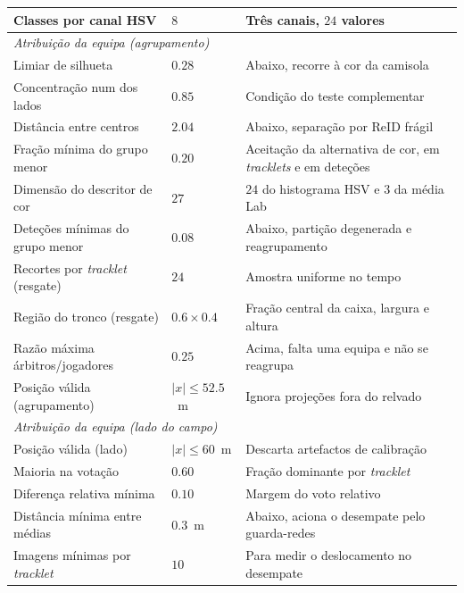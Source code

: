 \begin{table}[htbp]
\begin{tabular}{|l|l|l|}
        \hline
        Classes por canal HSV        & $8$             & Três canais, $24$ valores \\
        \hline
        \multicolumn{3}{|l|}{\emph{Atribuição da equipa (agrupamento)}} \\
        \hline
        Limiar de silhueta           & $0.28$          & Abaixo, recorre à cor da camisola \\
        \hline
        Concentração num dos lados   & $0.85$          & Condição do teste complementar \\
        \hline
        Distância entre centros      & $2.04$          & Abaixo, separação por ReID frágil \\
        \hline
        Fração mínima do grupo menor & $0.20$          & Aceitação da alternativa de cor, em \emph{tracklets} e em deteções \\
        \hline
        Dimensão do descritor de cor & $27$            & $24$ do histograma HSV e $3$ da média Lab \\
        \hline
        Deteções mínimas do grupo menor & $0.08$       & Abaixo, partição degenerada e reagrupamento \\
        \hline
        Recortes por \emph{tracklet} (resgate) & $24$  & Amostra uniforme no tempo \\
        \hline
        Região do tronco (resgate)   & $0.6 \times 0.4$ & Fração central da caixa, largura e altura \\
        \hline
        Razão máxima árbitros/jogadores & $0.25$       & Acima, falta uma equipa e não se reagrupa \\
        \hline
        Posição válida (agrupamento) & $|x| \le 52.5$~m & Ignora projeções fora do relvado \\
        \hline
        \multicolumn{3}{|l|}{\emph{Atribuição da equipa (lado do campo)}} \\
        \hline
        Posição válida (lado)        & $|x| \le 60$~m   & Descarta artefactos de calibração \\
        \hline
        Maioria na votação           & $0.60$          & Fração dominante por \emph{tracklet} \\
        \hline
        Diferença relativa mínima    & $0.10$          & Margem do voto relativo \\
        \hline
        Distância mínima entre médias & $0.3$~m        & Abaixo, aciona o desempate pelo guarda-redes \\
        \hline
        Imagens mínimas por \emph{tracklet} & $10$    & Para medir o deslocamento no desempate \\
        \hline
    \end{tabular}
\end{table}


